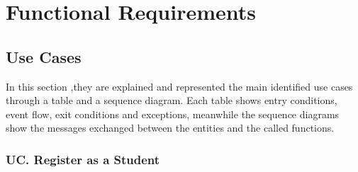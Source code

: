 \section{Functional Requirements}
\subsection{Use Cases}


In this section ,they are explained and represented the main identified use cases through a table and a sequence diagram. Each table shows entry conditions, event flow, exit conditions and exceptions, meanwhile the sequence diagrams show the messages exchanged between the entities and the called functions. 

\setcounter{uc}{1}
\newcommand{\cuc}{\theuc{}}
\subsubsection*{UC\cuc . Register as a Student}

